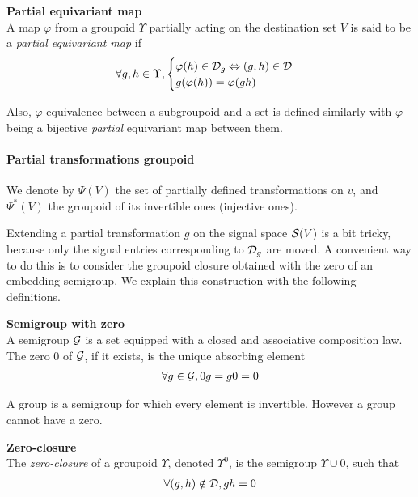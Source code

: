 \begin{definition}\textbf{Partial equivariant map}\\
A map $\varphi$ from a groupoid $\Upsilon$ partially acting on the destination set $V$ is said to be a \emph{partial equivariant map} if
\begin{gather*}
\forall g,h \in \Upsilon,
  \begin{cases}
    \varphi(h) \in \mathcal{D}_g \Leftrightarrow (g,h) \in \mathcal{D}\\
    g(\varphi(h)) = \varphi(gh)
  \end{cases}
\end{gather*}
\end{definition}

Also, $\varphi$-equivalence between a subgroupoid and a set is defined similarly with $\varphi$ being a bijective \emph{partial} equivariant map between them.

\paragraph{Partial transformations groupoid}
We denote by $\Psi(V)$ the set of partially defined transformations on $v$, and $\Psi^*(V)$ the groupoid of its invertible ones (\ie injective ones).

Extending a partial transformation $g$ on the signal space $\mathcal{S}(V)$ is a bit tricky, because only the signal entries corresponding to $\mathcal{D}_g$ are moved. A convenient way to do this is to consider the groupoid closure obtained with the zero of an embedding semigroup. We explain this construction with the following definitions.

\begin{definition}\textbf{Semigroup with zero}\\
A semigroup $\mathcal{G}$ is a set equipped with a closed and associative composition law. The zero $0$ of $\mathcal{G}$, if it exists, is the unique absorbing element \ie
\begin{gather*}
\forall g \in \mathcal{G}, 0g = g0 = 0
\end{gather*}
\end{definition}

\begin{remark}
A group is a semigroup for which every element is invertible. However a group cannot have a zero.
\end{remark}

\begin{definition}\textbf{Zero-closure}\\
The \emph{zero-closure} of a groupoid $\Upsilon$, denoted $\Upsilon^0$, is the semigroup $\Upsilon \cup {0}$, such that
\begin{gather*}
\forall (g,h) \notin \mathcal{D}, gh = 0
\end{gather*}
\end{definition}

